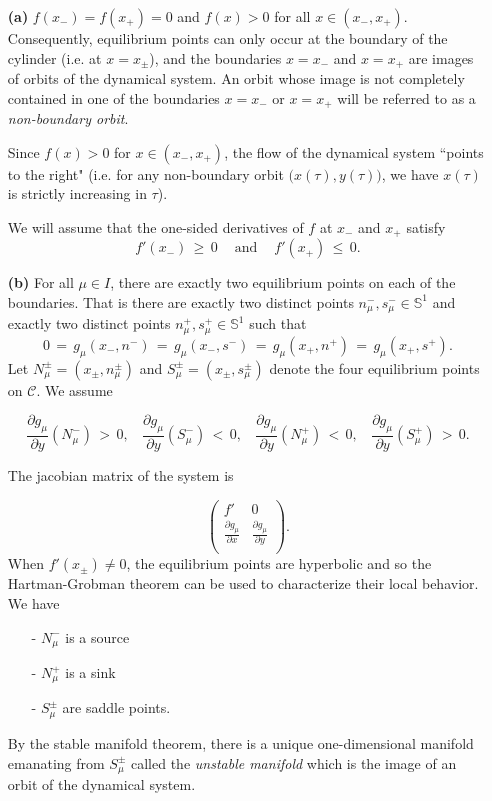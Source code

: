 \documentclass[11 pt]{article}
\renewcommand\({\left(}
\renewcommand\){\right)}
\newcommand\<{\langle}
\renewcommand\>{\rangle}
\newcommand\8{\infty}
\newcommand{\pd}{\partial}
\newcommand{\mc}{\mathcal}
\newcommand{\Sset}{\mathbb{S}}
\begin{document}
\begin{enumerate}

\item[\bf{(a)}] $f(x_-) = f(x_+) = 0$ and $f(x) > 0$ for all $x \in (x_-, x_+)$. Consequently, equilibrium points can only occur at the boundary of the cylinder (i.e. at $x = x_\pm$), and the boundaries $x = x_-$ and $x = x_+$ are images of orbits of the dynamical system. An orbit whose image is not completely contained in one of the boundaries $x = x_-$ or $x = x_+$ will be referred to as a \emph{non-boundary orbit}. 

Since $f(x) > 0$ for $x \in (x_-, x_+)$, the flow of the dynamical system ``points to the right" (i.e. for any non-boundary orbit $\big(x(\tau), y(\tau)\big)$, we have $x(\tau)$ is strictly increasing in $\tau$).

We will assume that the one-sided derivatives of $f$ at $x_-$ and $x_+$ satisfy 
\[
f'(x_-) \,\geq\, 0 \:\:\:\: \text{ and } \:\:\:\: f'(x_+) \,\leq\,0.
\]

\item[\bf{(b)}] For all $\mu \in I$, there are exactly two equilibrium points on each of the boundaries. That is there are exactly two distinct points $n^-_\mu, s^-_\mu\in\Sset^1$ and exactly two distinct points $n^+_\mu,s^+_\mu \in \Sset^1$ such that 
\[
0 \,=\, g_\mu(x_-, n^-) \,=\, g_\mu(x_-, s^-)\,=\, g_\mu(x_+, n^+) \,=\, g_\mu(x_+, s^+). 
\]
Let $N^{\pm}_\mu = (x_{\pm}, n^{\pm}_\mu)$ and $S^{\pm}_\mu = (x_{\pm}, s^{\pm}_\mu)$ denote the four equilibrium points on $\mc{C}$. We assume

\[
\frac{\pd g_\mu}{\pd y}(N^-_\mu) \,>\, 0, \:\:\:\: \frac{\pd g_\mu}{\pd y}(S^-_\mu) \,<\, 0, \:\:\:\: \frac{\pd g_\mu}{\pd y}(N^+_\mu) \,<\, 0, \:\:\:\: \frac{\pd g_\mu}{\pd y}(S^+_\mu) \,>\, 0.
\]



The jacobian matrix of the system is

\[
\begin{pmatrix}
f' & 0 \\
\frac{\pd g_\mu}{\pd x} & \frac{\pd g_\mu}{\pd y} \\
\end{pmatrix}.
\]
When $f'(x_{\pm}) \neq 0$, the equilibrium points are hyperbolic and so the Hartman-Grobman theorem can be used to characterize their local behavior. We have 

\begin{itemize}
\item[-] $N^-_\mu$ is a source
\item[-] $N^+_\mu$ is a sink
\item[-] $S^{\pm}_\mu$ are saddle points.
\end{itemize}
By the stable manifold theorem, there is a unique one-dimensional manifold emanating from $S^{\pm}_\mu$ called the \emph{unstable manifold} which is the image of an orbit of the dynamical system.  


\end{enumerate}
\end{document}
